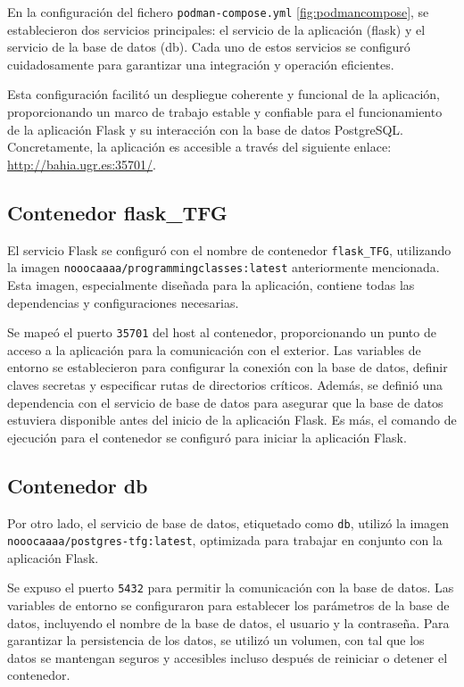 En la configuración del fichero \texttt{podman-compose.yml} \ref{fig:podmancompose}, se establecieron dos servicios principales: el servicio de la aplicación (flask) y el servicio de la base de datos (db). Cada uno de estos servicios se configuró cuidadosamente para garantizar una integración y operación eficientes. 

Esta configuración facilitó un despliegue coherente y funcional de la aplicación, proporcionando un marco de trabajo estable y confiable para el funcionamiento de la aplicación Flask y su interacción con la base de datos PostgreSQL. Concretamente, la aplicación es accesible a través del siguiente enlace: \href{http://bahia.ugr.es:35701/}{http://bahia.ugr.es:35701/}.

\subsection{Contenedor flask\_TFG}

El servicio Flask se configuró con el nombre de contenedor \texttt{flask\_TFG}, utilizando la imagen \texttt{nooocaaaa/programmingclasses:latest} anteriormente mencionada. Esta imagen, especialmente diseñada para la aplicación, contiene todas las dependencias y configuraciones necesarias. 

Se mapeó el puerto \texttt{35701} del host al contenedor, proporcionando un punto de acceso a la aplicación para la comunicación con el exterior. Las variables de entorno se establecieron para configurar la conexión con la base de datos, definir claves secretas y especificar rutas de directorios críticos. Además, se definió una dependencia con el servicio de base de datos para asegurar que la base de datos estuviera disponible antes del inicio de la aplicación Flask. Es más, el comando de ejecución para el contenedor se configuró para iniciar la aplicación Flask.

\subsection{Contenedor db}

Por otro lado, el servicio de base de datos, etiquetado como \texttt{db}, utilizó la imagen \texttt{nooocaaaa/postgres-tfg:latest}, optimizada para trabajar en conjunto con la aplicación Flask.

Se expuso el puerto \texttt{5432} para permitir la comunicación con la base de datos. Las variables de entorno se configuraron para establecer los parámetros de la base de datos, incluyendo el nombre de la base de datos, el usuario y la contraseña. Para garantizar la persistencia de los datos, se utilizó un volumen, con tal que los datos se mantengan seguros y accesibles incluso después de reiniciar o detener el contenedor.

